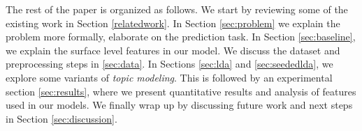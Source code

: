 The rest of the paper is organized as follows. We start by reviewing some of the existing work in Section \ref{relatedwork}. In Section \ref{sec:problem} we explain the problem more formally, elaborate on the prediction task. In Section \ref{sec:baseline}, we explain the surface level features in our model. We discuss the dataset and preprocessing steps in \ref{sec:data}. In Sections \ref{sec:lda} and \ref{sec:seededlda}, we explore some variants of \textit{topic modeling}. This is followed by an experimental section \ref{sec:results}, where we present quantitative results and analysis of features used in our models. We finally wrap up by discussing future work and next steps in Section \ref{sec:discussion}.

